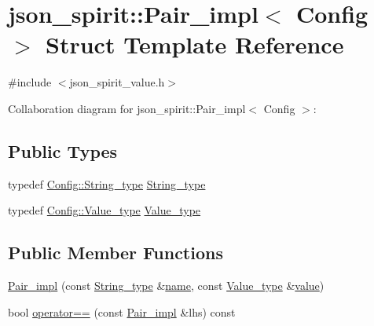 \hypertarget{structjson__spirit_1_1_pair__impl}{}\section{json\+\_\+spirit\+:\+:Pair\+\_\+impl$<$ Config $>$ Struct Template Reference}
\label{structjson__spirit_1_1_pair__impl}


{\ttfamily \#include $<$json\+\_\+spirit\+\_\+value.\+h$>$}



Collaboration diagram for json\+\_\+spirit\+:\+:Pair\+\_\+impl$<$ Config $>$\+:
\subsection*{Public Types}
\begin{DoxyCompactItemize}
\item 
typedef \hyperlink{structjson__spirit_1_1_config__vector_a9f0a96da6042290c5bc25c1b3269e747}{Config\+::\+String\+\_\+type} \hyperlink{structjson__spirit_1_1_pair__impl_a76ee499775d02d1038a2b8c71621f2c8}{String\+\_\+type}
\item 
typedef \hyperlink{structjson__spirit_1_1_config__vector_aa06382368ae0d04aa77534d6f73592c8}{Config\+::\+Value\+\_\+type} \hyperlink{structjson__spirit_1_1_pair__impl_aa679fec3c6ec4c76f94460d3815cf1fb}{Value\+\_\+type}
\end{DoxyCompactItemize}
\subsection*{Public Member Functions}
\begin{DoxyCompactItemize}
\item 
\hyperlink{structjson__spirit_1_1_pair__impl_a17be0aede10233fadd376a3fb77fd962}{Pair\+\_\+impl} (const \hyperlink{structjson__spirit_1_1_pair__impl_a76ee499775d02d1038a2b8c71621f2c8}{String\+\_\+type} \&\hyperlink{testharness_8cc_a8f8f80d37794cde9472343e4487ba3eb}{name}, const \hyperlink{structjson__spirit_1_1_pair__impl_aa679fec3c6ec4c76f94460d3815cf1fb}{Value\+\_\+type} \&\hyperlink{cache_8cc_a0f61d63b009d0880a89c843bd50d8d76}{value})
\item 
bool \hyperlink{structjson__spirit_1_1_pair__impl_ad089882177e46e07ac096328573e1f4c}{operator==} (const \hyperlink{structjson__spirit_1_1_pair__impl}{Pair\+\_\+impl} \&lhs) const 
\end{DoxyCompactItemize}
